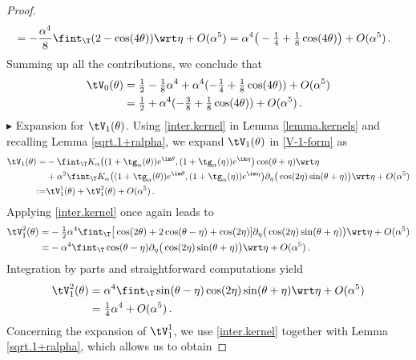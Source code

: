 \documentclass[a4paper,reqno,10pt]{article}
\newcommand{\pa}{\partial}
\begin{document}
\begin{proof}
\begin{align}
	 		& =  - \frac{\alpha^4}{8} \fint_{\T}(2-\cos(4\theta)) \wrt \eta + O(\alpha^5)  = \alpha^4\big( -\tfrac14 + \tfrac18 \cos(4\theta)\big) + O(\alpha^5)\,.
	 	\end{align}
	 Summing up all the contributions, we conclude that
	 	\begin{align}
	 	\tV_{0} (\theta)&  = \tfrac12 - \tfrac18 \alpha^4+ \alpha^4 (-\tfrac14 + \tfrac18\cos(4\theta)) + O(\alpha^5) \\
	 		&= \tfrac12 +\alpha^4(-\tfrac38 + \tfrac18\cos(4\theta)) + O(\alpha^5) \,.\label{calcetto2}
	 	\end{align}
\noindent $\blacktriangleright$ {\sc Expansion for $\tV_{1}(\theta)$.}
 Using \eqref{inter.kernel} in Lemma \ref{lemma.kernels} and recalling Lemma \ref{sqrt.1+ralpha}, we expand $\tV_{1}(\theta)$ in \eqref{V-1-form} as
\begin{align*}
		\tV_{1}(\theta) =&	- \fint_{\T} K_\alpha\big((1+\tg_{\alpha}(\theta)) e^{\im\theta}, (1+\tg_{\alpha}(\eta))e^{\im\eta} \big) \cos(\theta+\eta)  \wrt \eta  \\
       & +\alpha^2 \fint_{\T} K_\alpha\big((1+\tg_{\alpha}(\theta)) e^{\im\theta}, (1+\tg_{\alpha}(\eta))e^{\im\eta} \big) \pa_{\eta} \big( \cos(2\eta) \sin(\theta+\eta) \big) \wrt \eta +O(\alpha^5)\\
   :=&\tV_{1}^1(\theta)+\tV_{1}^2(\theta)+O(\alpha^5)\,.
	\end{align*}
    Applying \eqref{inter.kernel} once again leads to
    \begin{align*}
		\tV_{1}^2(\theta) =&-\tfrac12\alpha^4 \fint_{\T} \big[\cos(2\theta)+2\cos(\theta-\eta)+\cos(2\eta)] \pa_{\eta}\big( \cos(2\eta) \sin(\theta+\eta) \big) \wrt \eta +O(\alpha^5)\\
       =&-\alpha^4 \fint_{\T} \cos(\theta-\eta) \pa_{\eta}\big( \cos(2\eta) \sin(\theta+\eta) \big) \wrt \eta +O(\alpha^5)\,.
	\end{align*}
    Integration by parts and straightforward computations yield
    \begin{align*}
		\tV_{1}^2(\theta) 
       &= \alpha^4 \fint_{\T} \sin(\theta-\eta)  \cos(2\eta) \sin(\theta+\eta)  \wrt \eta +O(\alpha^5)\\
      &=\tfrac14 \alpha^4 +O(\alpha^5)\,. 
	\end{align*}
    Concerning the expansion of $\tV_{1}^1$, we use \eqref{inter.kernel} together with Lemma \ref{sqrt.1+ralpha}, which allows us to obtain

\end{proof}
\end{document}
